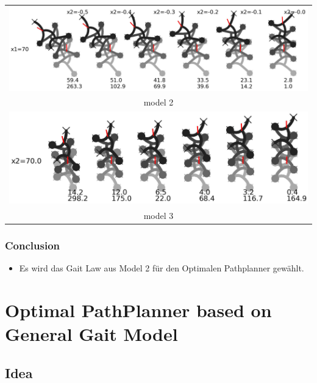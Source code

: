 \documentclass[10pt,a4paper]{article}
\begin{document}
\begin{tabular}{c}
\includegraphics[width=.95\textwidth]{pics/model_2/gait_zoom.jpg} \\
model 2 \\
\includegraphics[width=.95\textwidth]{pics/model_3/gait_zoom.jpg} \\
model 3 \\
\end{tabular}

\subsubsection{Conclusion}

\begin{itemize}
	\item Es wird das Gait Law aus Model 2 für den Optimalen Pathplanner gewählt.
\end{itemize}




\section{Optimal PathPlanner based on General Gait Model}

\subsection{Idea}
\end{document}
